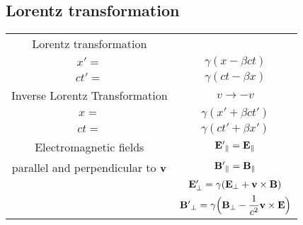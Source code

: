 
\subsection{Lorentz transformation} 
\center
\begin{tabular}{|c|c|}
\hline
Lorentz transformation & \\

$x' = $ & $\gamma(x - \beta ct)$ \\

$ct' = $ & $ \gamma(ct - \beta x)$

\\ \hline

Inverse Lorentz Transformation & $v \rightarrow -v$ \\

$x = $ & $\gamma(x'+ \beta ct') $ \\

$ct = $ & $\gamma (ct' + \beta x')$

\\ \hline

Electromagnetic fields & $\bold{E'}_{\parallel} = \bold{E}_{\parallel}$ \\
parallel and perpendicular to $\bold{v}$ & $\bold{B'}_{\parallel} = \bold{B}_{\parallel}$ \\
& $\bold{E'_{\bot}} = \gamma (\bold{E}_{\bot} + \bold{v} \times \bold{B})$ \\
& $\bold{B'}_{\bot} = \gamma\Big(\bold{B}_{\bot} - \dfrac{1}{c^2}\bold{v}\times\bold{E}\Big)$

\\ \hline
\end{tabular}
\flushleft

